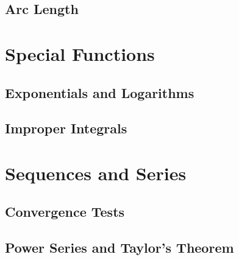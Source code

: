 \documentclass[12pt]{article}
\theoremstyle{definition}
\theoremstyle{plain}
\numberwithin{equation}{section}
\begin{document}
\subsection{Arc Length}



\section{Special Functions}

\subsection{Exponentials and Logarithms}

\subsection{Improper Integrals}



\section{Sequences and Series}

\subsection{Convergence Tests}

\subsection{Power Series and Taylor's Theorem}

\end{document}

